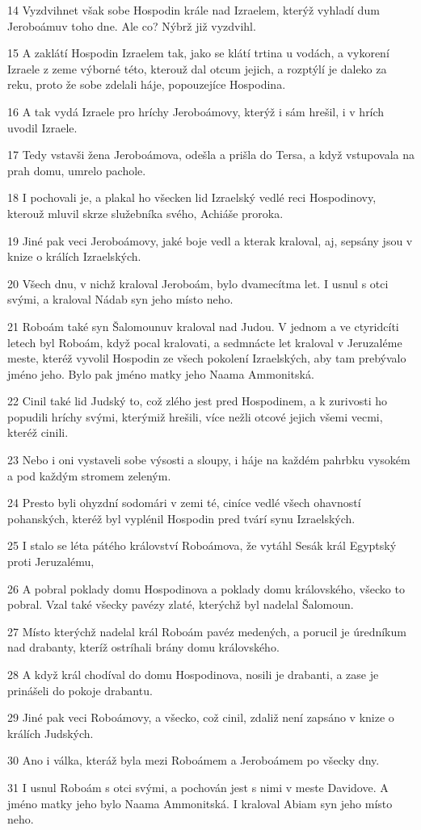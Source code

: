 \par 14 Vyzdvihnet však sobe Hospodin krále nad Izraelem, kterýž vyhladí dum Jeroboámuv toho dne. Ale co? Nýbrž již vyzdvihl.
\par 15 A zaklátí Hospodin Izraelem tak, jako se klátí trtina u vodách, a vykorení Izraele z zeme výborné této, kterouž dal otcum jejich, a rozptýlí je daleko za reku, proto že sobe zdelali háje, popouzejíce Hospodina.
\par 16 A tak vydá Izraele pro hríchy Jeroboámovy, kterýž i sám hrešil, i v hrích uvodil Izraele.
\par 17 Tedy vstavši žena Jeroboámova, odešla a prišla do Tersa, a když vstupovala na prah domu, umrelo pachole.
\par 18 I pochovali je, a plakal ho všecken lid Izraelský vedlé reci Hospodinovy, kterouž mluvil skrze služebníka svého, Achiáše proroka.
\par 19 Jiné pak veci Jeroboámovy, jaké boje vedl a kterak kraloval, aj, sepsány jsou v knize o králích Izraelských.
\par 20 Všech dnu, v nichž kraloval Jeroboám, bylo dvamecítma let. I usnul s otci svými, a kraloval Nádab syn jeho místo neho.
\par 21 Roboám také syn Šalomounuv kraloval nad Judou. V jednom a ve ctyridcíti letech byl Roboám, když pocal kralovati, a sedmnácte let kraloval v Jeruzaléme meste, kteréž vyvolil Hospodin ze všech pokolení Izraelských, aby tam prebývalo jméno jeho. Bylo pak jméno matky jeho Naama Ammonitská.
\par 22 Cinil také lid Judský to, což zlého jest pred Hospodinem, a k zurivosti ho popudili hríchy svými, kterýmiž hrešili, více nežli otcové jejich všemi vecmi, kteréž cinili.
\par 23 Nebo i oni vystaveli sobe výsosti a sloupy, i háje na každém pahrbku vysokém a pod každým stromem zeleným.
\par 24 Presto byli ohyzdní sodomári v zemi té, ciníce vedlé všech ohavností pohanských, kteréž byl vyplénil Hospodin pred tvárí synu Izraelských.
\par 25 I stalo se léta pátého království Roboámova, že vytáhl Sesák král Egyptský proti Jeruzalému,
\par 26 A pobral poklady domu Hospodinova a poklady domu královského, všecko to pobral. Vzal také všecky pavézy zlaté, kterýchž byl nadelal Šalomoun.
\par 27 Místo kterýchž nadelal král Roboám pavéz medených, a porucil je úredníkum nad drabanty, kteríž ostríhali brány domu královského.
\par 28 A když král chodíval do domu Hospodinova, nosili je drabanti, a zase je prinášeli do pokoje drabantu.
\par 29 Jiné pak veci Roboámovy, a všecko, což cinil, zdaliž není zapsáno v knize o králích Judských.
\par 30 Ano i válka, kteráž byla mezi Roboámem a Jeroboámem po všecky dny.
\par 31 I usnul Roboám s otci svými, a pochován jest s nimi v meste Davidove. A jméno matky jeho bylo Naama Ammonitská. I kraloval Abiam syn jeho místo neho.

